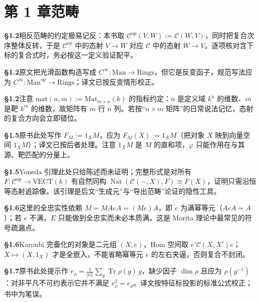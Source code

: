 \section*{第 1 章\quad 范畴}
\noindent\textbf{§1.2}\quad 相反范畴的约定极易记反：本书取 $\mathcal C^{\mathrm{op}}(V,W):=\mathcal C(W,V)$，同时把复合次序整体反转，于是 $\mathcal C^{\mathrm{op}}$ 中的态射 $V\to W$ 对应 $\mathcal C$ 中的态射 $W\to V$。逐项核对含下标的复合式时，务必按这一定义验证配平。\par\medskip
\noindent\textbf{§1.2}\quad 原文把光滑函数构造写成 $C^\infty\colon\mathrm{Man}\to\mathrm{Rings}$，但它是反变函子，规范写法应为 $C^\infty\colon\mathrm{Man}^{\mathrm{op}}\to\mathrm{Rings}$；译文已按反变情形校正。\par\medskip
\noindent\textbf{§1.2}\quad 注意 $\mathrm{mat}(n,m):=\mathrm{Mat}_{m\times n}(k)$ 的指标约定：$n$ 是定义域 $k^n$ 的维数、$m$ 是靶 $k^m$ 的维数，故矩阵有 $m$ 行 $n$ 列。若按“$n\times m$ 矩阵”的日常说法记忆，态射的复合方向会立即错位。\par\medskip
\noindent\textbf{§1.5}\quad 原书此处写作 $F_M:=1_XM$，应为 $F_M(X):=1_XM$（把对象 $X$ 映到向量空间 $1_XM$）；译文已按后者处理。注意 $1_XM$ 是 $M$ 的直和项，$\varphi$ 只能作用在与其源、靶匹配的分量上。\par\medskip
\noindent\textbf{§1.5}\quad Yoneda 引理此处只给陈述而未证明；完整形式是对所有 $F\colon\mathcal C^{\mathrm{op}}\to\mathrm{VECT}(k)$ 有自然同构 $\operatorname{Nat}(\mathcal C(-,X),F)\cong F(X)$，证明只需沿恒等态射追踪像。该引理是后文“生成元”与“导出范畴”论证的隐性工具。\par\medskip
\noindent\textbf{§1.6}\quad 这里的全忠实性依赖 $M=MAeA=(Me)A$，即 $e$ 为满幂等元（$AeA=A$）；若 $e$ 不满，$E$ 只能做到全忠实而未必本质满。这是 Morita 理论中最常见的符号疏漏点。\par\medskip
\noindent\textbf{§1.6}\quad Karoubi 完备化的对象是二元组 $(X,e)$，Hom 空间取 $e'\mathcal C(X,X')e$；$X\mapsto(X,1_X)$ 才是全嵌入，不能省略幂等元 $e$ 的左右夹逼，否则复合不封闭。\par\medskip
\noindent\textbf{§1.7}\quad 原书此处提示作 $e_\rho=\tfrac{1}{|G|}\sum_g\operatorname{Tr}\rho(g)\,g$，缺少因子 $\dim\rho$ 且应为 $\rho(g^{-1})$：对非平凡不可约表示它并不满足 $e_\rho^2=e_\rho$。译文按特征标投影的标准公式校正；书中为笔误。\par\medskip
